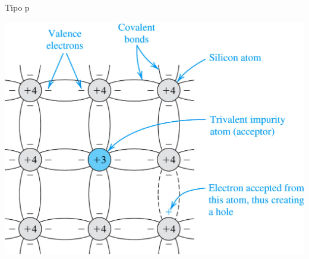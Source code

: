 \documentclass[xcolor={usenames,svgnames,dvipsnames}]{beamer}
\begin{document}
\begin{frame}[label={sec:org3d7d55f}]{Tipo p}
\begin{center}
\includegraphics[width=.9\linewidth]{../figs/DopajeP.jpg}
\end{center}
\end{frame}
\end{document}
